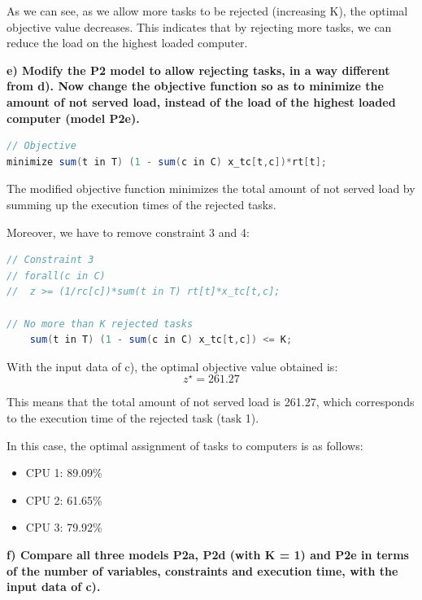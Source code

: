 \documentclass{article}
\begin{document}
As we can see, as we allow more tasks to be rejected (increasing K), the optimal objective value decreases. This indicates that by rejecting more tasks, we can reduce the load on the highest loaded computer.

\newpage
\textbf{e) Modify the P2 model to allow rejecting tasks, in a way different from d). Now change the objective function so as to minimize the amount of not served load, instead of the load of the highest loaded computer (model P2e).}

\begin{lstlisting}[language=Java, frame=single, xleftmargin=0pt]
// Objective
minimize sum(t in T) (1 - sum(c in C) x_tc[t,c])*rt[t];
\end{lstlisting}

The modified objective function minimizes the total amount of not served load by summing up the execution times of the rejected tasks.
\medskip

Moreover, we have to remove constraint 3 and 4:

\begin{lstlisting}[language=Java, frame=single, xleftmargin=0pt]
// Constraint 3
// forall(c in C)
//	z >= (1/rc[c])*sum(t in T) rt[t]*x_tc[t,c];

// No more than K rejected tasks
	sum(t in T) (1 - sum(c in C) x_tc[t,c]) <= K;
\end{lstlisting}

With the input data of c), the optimal objective value obtained is:
\[z^\star = 261.27\]

This means that the total amount of not served load is 261.27, which corresponds to the execution time of the rejected task (task 1).

In this case, the optimal assignment of tasks to computers is as follows:
\begin{itemize}
    \item CPU 1: 89.09\%
    \item CPU 2: 61.65\%
    \item CPU 3: 79.92\%
\end{itemize}

\bigskip
\textbf{f) Compare all three models P2a, P2d (with K = 1) and P2e in terms of the number of variables, constraints and execution time, with the input data of c).}
\medskip
\end{document}
